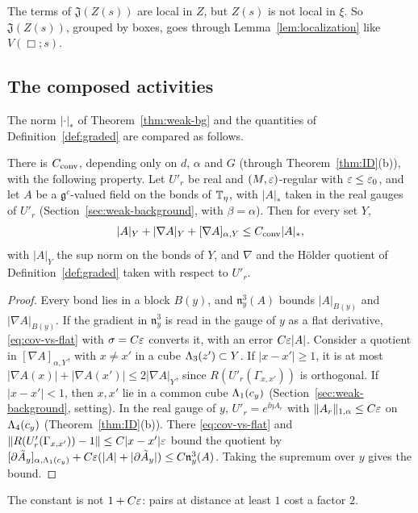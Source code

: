 The terms of $\mathfrak J(Z(s))$ are local in $Z$, but $Z(s)$ is not local in $\xi$. So $\mathfrak J(Z(s))$, grouped by boxes, goes through Lemma~\ref{lem:localization} like $V(\Box;s)$.

\subsection{The composed activities}\label{subsec:sq-composed}

The norm $|\cdot|_*$ of Theorem~\ref{thm:weak-bg} and the quantities of Definition~\ref{def:graded} are compared as follows.

\begin{lemma}\label{lem:norm-conversion}
There is $C_{\rm conv}$, depending only on $d$, $\alpha$ and $G$ (through Theorem~\ref{thm:ID}(b)), with the following property. Let $U'_r$ be real and $(M,\varepsilon)$-regular with $\varepsilon\le\varepsilon_0$, and let $A$ be a $\mathfrak g^c$-valued field on the bonds of $\mathbb T_\eta$, with $|A|_*$ taken in the real gauges of $U'_r$ (Section~\ref{sec:weak-background}, with $\beta=\alpha$). Then for every set $Y$,
\[
|A|_Y+|\nabla A|_Y+[\nabla A]_{\alpha,Y}\le C_{\rm conv}|A|_*,
\]
with $|A|_Y$ the sup norm on the bonds of $Y$, and $\nabla$ and the H\"older quotient of Definition~\ref{def:graded} taken with respect to $U'_r$.
\end{lemma}

\begin{proof}
Every bond lies in a block $B(y)$, and $\mathfrak n^3_y(A)$ bounds $|A|_{B(y)}$ and $|\nabla A|_{B(y)}$. If the gradient in $\mathfrak n^3_y$ is read in the gauge of $y$ as a flat derivative, \eqref{eq:cov-vs-flat} with $\sigma=C\varepsilon$ converts it, with an error $C\varepsilon|A|$. Consider a quotient in $[\nabla A]_{\alpha,Y}$, with $x\ne x'$ in a cube $\Lambda_3(z')\subset Y$. If $|x-x'|\ge1$, it is at most $|\nabla A(x)|+|\nabla A(x')|\le2|\nabla A|_Y$, since $R(U'_r(\Gamma_{x,x'}))$ is orthogonal. If $|x-x'|<1$, then $x,x'$ lie in a common cube $\Lambda_1(c_y)$ (Section~\ref{sec:weak-background}, setting). In the real gauge of $y$, $U'_r=e^{\ii\eta A_r}$ with $\|A_r\|_{1,\alpha}\le C\varepsilon$ on $\Lambda_4(c_y)$ (Theorem~\ref{thm:ID}(b)). There \eqref{eq:cov-vs-flat} and $\|R(U'_r(\Gamma_{x,x'}))-1\|\le C|x-x'|\varepsilon$ bound the quotient by $[\partial\tilde A_y]_{\alpha,\Lambda_1(c_y)}+C\varepsilon(|A|+|\partial\tilde A_y|)\le C\mathfrak n^3_y(A)$. Taking the supremum over $y$ gives the bound.
\end{proof}

The constant is not $1+C\varepsilon$: pairs at distance at least $1$ cost a factor $2$.

